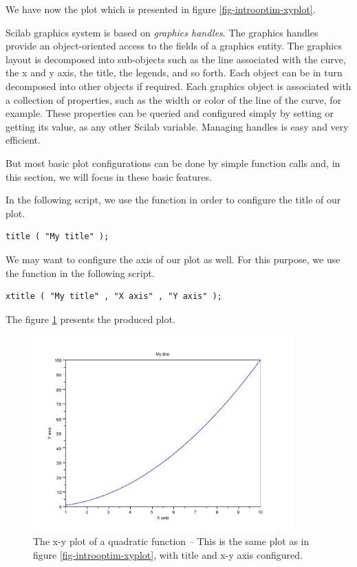 We have now the plot which is presented in figure \ref{fig-introoptim-xyplot}.

Scilab graphics system is based on \emph{graphics handles}.
The graphics handles provide an object-oriented access to the 
fields of a graphics entity. The graphics layout is decomposed into 
sub-objects such as the line associated with the curve, the x and y axis, 
the title, the legends, and so forth. Each object can be in turn decomposed 
into other objects if required. Each graphics object is associated 
with a collection of properties, such as the width or color of the line of the 
curve, for example. These properties can be queried 
and configured simply by setting or getting its value, as any other
Scilab variable. Managing handles is easy and very efficient.

But most basic plot configurations can be done by 
simple function calls and, in this section, we will focus in these 
basic features.

In the following script, we use the  
function in order to configure the title of our plot.
\lstset{language=scilabscript}
\begin{lstlisting}
title ( "My title" );
\end{lstlisting}

We may want to configure the axis of our plot as well.
For this purpose, we use the  function 
in the following script.
\lstset{language=scilabscript}
\begin{lstlisting}
xtitle ( "My title" , "X axis" , "Y axis" );
\end{lstlisting}

The figure \ref{fig-introscilab-demotitle} presents the produced 
plot.

\begin{figure}
\begin{center}
\includegraphics[width=10cm]{introscilab/xyplot_title.pdf}
\end{center}
\caption{The x-y plot of a quadratic function -- This is the same plot as in figure \ref{fig-introoptim-xyplot},
with title and x-y axis configured.}
\label{fig-introscilab-demotitle}
\end{figure}

